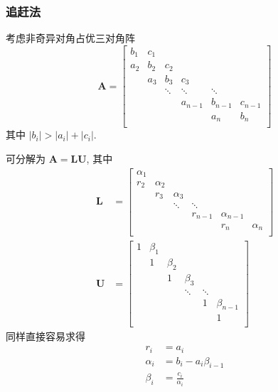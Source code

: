 \documentclass{ctexart}
\begin{document}
\subsubsection{追赶法}
    考虑非奇异对角占优三对角阵 \[
        \mathbf{A} = \begin{bmatrix}
            b_1 & c_1 &        &         &         &         \\
            a_2 & b_2 & c_2    &         &         &         \\
                & a_3 & b_3    & c_3     &         &         \\
                &     & \ddots & \ddots  & \ddots  &         \\
                &     &        & a_{n-1} & b_{n-1} & c_{n-1} \\
                &     &        &         & a_n     & b_n     \\
        \end{bmatrix}\]
    其中 $|b_i| > |a_i| + |c_i|$.\par
    可分解为 $\mathbf{A} = \mathbf{L} \mathbf{U}$, 其中 \begin{align*}
        \mathbf{L} &= \begin{bmatrix}
            \alpha_1 &          &          &         &              &          \\
            r_2      & \alpha_2 &          &         &              &          \\
                     & r_3      & \alpha_3 &         &              &          \\
                     &          & \ddots   & \ddots  &              &          \\
                     &          &          & r_{n-1} & \alpha_{n-1} &          \\
                     &          &          &         & r_n          & \alpha_n \\
        \end{bmatrix}\\
        \mathbf{U} &= \begin{bmatrix}
            1 & \beta_1 &         &         &         &             \\
              & 1       & \beta_2 &         &         &             \\
              &         & 1       & \beta_3 &         &             \\
              &         &         & \ddots  & \ddots  &             \\
              &         &         &         & 1       & \beta_{n-1} \\
              &         &         &         &         & 1           \\
        \end{bmatrix}\end{align*}
    同样直接容易求得 \begin{align*}
        r_i &= a_i\\
        \alpha_i &= b_i - a_i \beta_{i-1}\\
        \beta_i &= \frac{c_i}{\alpha_i}
    \end{align*}
\end{document}
